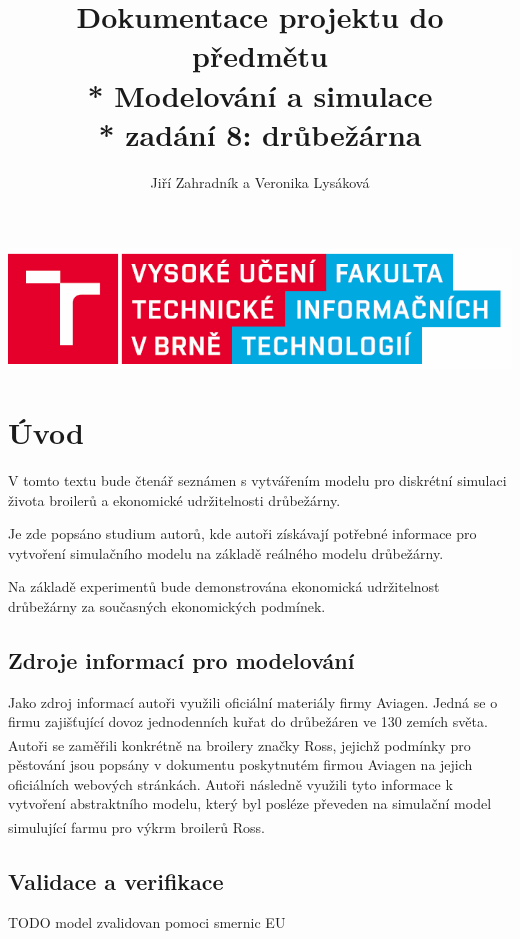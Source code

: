 \documentclass[a4paper,10pt]{article}
\title{Dokumentace projektu do předmětu \\* Modelování a simulace\\* zadání 8: drůbežárna}
\author{Jiří Zahradník a Veronika Lysáková}
\date{}
\begin{document}
\maketitle
\includegraphics[scale=0.5]{fitnewb.png}
\pagebreak

\renewcommand{\contentsname}{Obsah}
\tableofcontents


\renewcommand{\figurename}{Obrázek}


\pagebreak

%
%

\section{Úvod}
V tomto textu bude čtenář seznámen s vytvářením modelu pro diskrétní simulaci 
života broilerů a ekonomické udržitelnosti drůbežárny.
\par 
Je zde popsáno studium autorů, kde autoři získávají potřebné informace
pro vytvoření simulačního modelu na základě reálného modelu drůbežárny.
\par
Na základě experimentů bude demonstrována ekonomická udržitelnost
drůbežárny za současných ekonomických podmínek.

\subsection{Zdroje informací pro modelování\cite{modelovani}}\label{zdroje}
Jako zdroj informací autoři využili oficiální materiály firmy Aviagen\cite{aviagen}.
Jedná se o firmu zajišťující dovoz jednodenních kuřat do drůbežáren ve 130 zemích světa.
Autoři se zaměřili konkrétně na broilery značky Ross\textsuperscript{\textregistered},
jejichž podmínky pro pěstování jsou popsány v dokumentu poskytnutém firmou Aviagen\cite{ross}
na jejich oficiálních webových stránkách. Autoři následně využili tyto informace k
vytvoření abstraktního modelu\cite{abstract_model}, který byl posléze převeden na simulační model\cite{simulation_model}
simulující farmu pro výkrm broilerů Ross\textsuperscript{\textregistered}. 

\subsection{Validace a verifikace}\label{validaceVerifikace}
TODO model zvalidovan pomoci smernic EU
\end{document}
